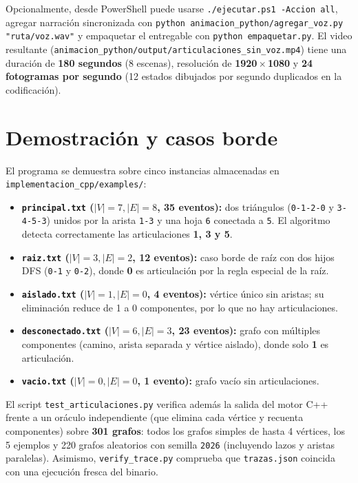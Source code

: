 \documentclass[11pt,a4paper]{article}
\begin{document}
Opcionalmente, desde PowerShell puede usarse \texttt{./ejecutar.ps1 -Accion all},
agregar narración sincronizada con \texttt{python animacion\_python/agregar\_voz.py
"ruta/voz.wav"} y empaquetar el entregable con \texttt{python empaquetar.py}. El
video resultante (\texttt{animacion\_python/output/articulaciones\_sin\_voz.mp4})
tiene una duración de \textbf{180 segundos} (8 escenas), resolución de
\textbf{1920\,$\times$\,1080} y \textbf{24 fotogramas por segundo} (12 estados
dibujados por segundo duplicados en la codificación).

\section{Demostración y casos borde}
El programa se demuestra sobre cinco instancias almacenadas en
\texttt{implementacion\_cpp/examples/}:
\begin{itemize}
  \item \textbf{\texttt{principal.txt} ($|V|=7, |E|=8$, 35 eventos):} dos
    triángulos (\texttt{0-1-2-0} y \texttt{3-4-5-3}) unidos por la arista
    \texttt{1-3} y una hoja \texttt{6} conectada a \texttt{5}. El algoritmo
    detecta correctamente las articulaciones \textbf{1, 3 y 5}.
  \item \textbf{\texttt{raiz.txt} ($|V|=3, |E|=2$, 12 eventos):} caso borde de
    raíz con dos hijos DFS (\texttt{0-1} y \texttt{0-2}), donde \textbf{0} es
    articulación por la regla especial de la raíz.
  \item \textbf{\texttt{aislado.txt} ($|V|=1, |E|=0$, 4 eventos):} vértice
    único sin aristas; su eliminación reduce de 1 a 0 componentes, por lo que
    no hay articulaciones.
  \item \textbf{\texttt{desconectado.txt} ($|V|=6, |E|=3$, 23 eventos):} grafo
    con múltiples componentes (camino, arista separada y vértice aislado),
    donde solo \textbf{1} es articulación.
  \item \textbf{\texttt{vacio.txt} ($|V|=0, |E|=0$, 1 evento):} grafo vacío
    sin articulaciones.
\end{itemize}

El script \texttt{test\_articulaciones.py} verifica además la salida del motor
C++ frente a un oráculo independiente (que elimina cada vértice y recuenta
componentes) sobre \textbf{301 grafos}: todos los grafos simples de hasta 4
vértices, los 5 ejemplos y 220 grafos aleatorios con semilla \texttt{2026}
(incluyendo lazos y aristas paralelas). Asimismo, \texttt{verify\_trace.py}
comprueba que \texttt{trazas.json} coincida con una ejecución fresca del binario.
\end{document}
